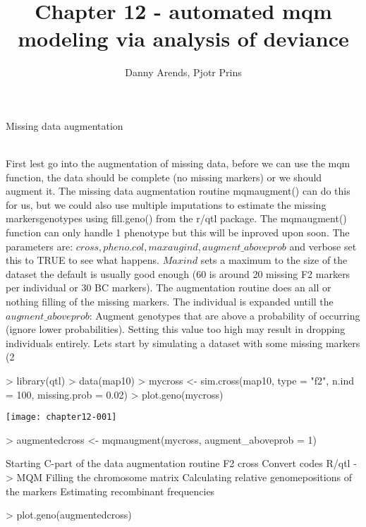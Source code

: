 \documentclass[a4paper]{article}
\title { Chapter 12 - automated mqm modeling via analysis of deviance }
\author { Danny Arends, Pjotr Prins }
\begin{document}
\maketitle
\clearpage
\begin{Large} Missing data augmentation \end{Large}\\
First lest go into the augmentation of missing data, before we can use the mqm function, the data should be complete (no missing markers)
or we should augment it. The missing data augmentation routine mqmaugment() can do this for us, but we could also use multiple imputations
to estimate the missing markersgenotypes using fill.geno() from the r/qtl package. The mqmaugment() function can only handle 1 phenotype but this will be inproved upon soon. The parameters are:
$cross, pheno.col, maxaugind, augment\_aboveprob$ and verbose set this to TRUE to see what happens. $Maxind$ sets a maximum to the size of the dataset the default is usually good enough (60 is around 20 missing F2 markers per individual or 30 BC markers). The augmentation routine does an all or nothing filling of the missing markers. The individual is expanded untill the $augment\_aboveprob$: Augment genotypes that are above a probability of occurring (ignore lower probabilities). Setting this value too high may result in dropping individuals entirely.
Lets start by simulating a dataset with some missing markers (2%
\\
\begin{Schunk}
\begin{Sinput}
> library(qtl)
> data(map10)
> mycross <- sim.cross(map10, type = "f2", n.ind = 100, missing.prob = 0.02)
> plot.geno(mycross)
\end{Sinput}
\end{Schunk}
\texttt{[image: chapter12-001]}
\begin{Schunk}
\begin{Sinput}
> augmentedcross <- mqmaugment(mycross, augment_aboveprob = 1)
\end{Sinput}
\begin{Soutput}
Starting C-part of the data augmentation routine
F2 cross
Convert codes R/qtl -> MQM
Filling the chromosome matrix
Calculating relative genomepositions of the markers
Estimating recombinant frequencies
\end{Soutput}
\begin{Sinput}
> plot.geno(augmentedcross)
\end{Sinput}
\end{Schunk}
\end{document}
